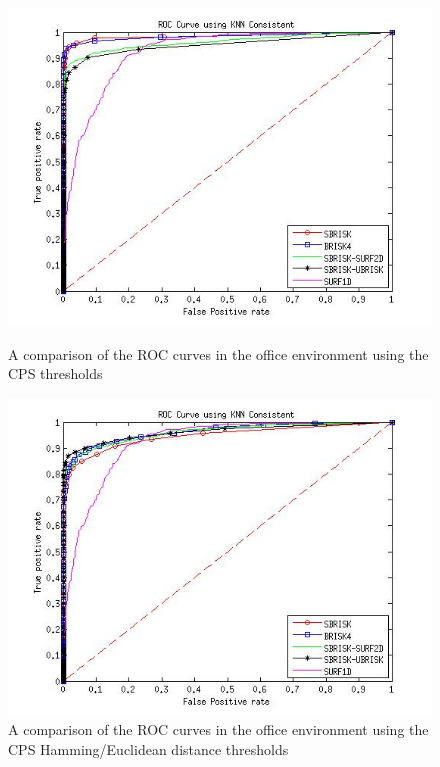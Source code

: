 \documentclass[11pt]{report}
\begin{document}
\begin{figure}[ht!]
\begin{minipage}[b]{0.5\linewidth}
\includegraphics[scale=0.4]{../Drawings/dataset2_ROC_General_KNN_Consistent.jpg}
\caption{A comparison of the ROC curves in the office environment using the CPS thresholds}
\label{fig:compareKnnConsistentOffice}
\end{minipage}
\hspace{0.5cm}
\begin{minipage}[b]{0.5\linewidth}
\includegraphics[scale=0.4]{../Drawings/dataset2_ROC_General_Hamming_Consistent.jpg}
\caption{A comparison of the ROC curves in the office environment using the CPS Hamming/Euclidean distance thresholds}
\label{fig:compareHammingConsistentOffice}
\end{minipage}
\end{figure}
\end{document}

